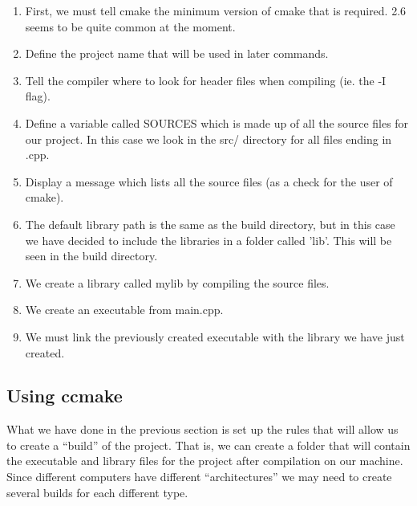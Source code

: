 \begin{enumerate}
\item First, we must tell cmake the minimum version of cmake that is
  required. 2.6 seems to be quite common at the moment.
\item Define the project name that will be used in later commands.
\item Tell the compiler where to look for header files when compiling
  (ie. the -I flag).
\item Define a variable called SOURCES which is made up of all the
  source files for our project. In this case we look in the src/
  directory for all files ending in .cpp.
\item Display a message which lists all the source files (as a check
  for the user of cmake).
\item The default library path is the same as the build directory, but
  in this case we have decided to include the libraries in a folder
  called 'lib'. This will be seen in the build directory.
\item We create a library called mylib by compiling the source files.
\item We create an executable from main.cpp.
\item We must link the previously created executable with the library
  we have just created.
\end{enumerate}

\subsection{Using ccmake}
\label{sec:using-ccmake}


What we have done in the previous section is set up the rules that
will allow us to create a ``build'' of the project. That is, we can
create a folder that will contain the executable and library files for
the project after compilation on our machine. Since different
computers have different ``architectures'' we may need to create
several builds for each different type.

